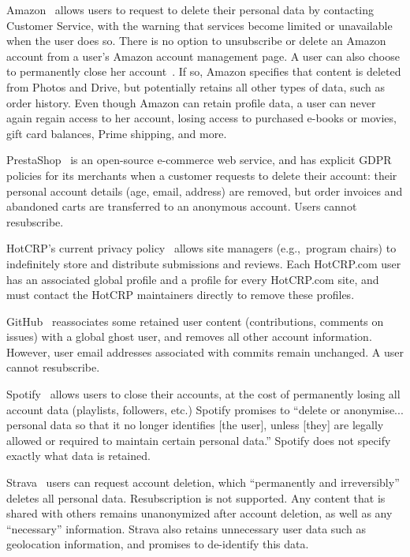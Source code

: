 Amazon~\cite{amazon:privacy} allows users to request to delete their personal data by contacting
Customer Service, with the warning that services become limited or unavailable when the user does
so. There is no option to unsubscribe or delete an Amazon account from a user's Amazon account
management page.  A user can also choose to permanently close her account~\cite{amazon:close}. If
so, Amazon specifies that content is deleted from Photos and Drive, but potentially retains all other types
of data, such as order history. Even though Amazon can retain profile data, a user can never
again regain access to her account, losing access to purchased e-books or movies, gift card
balances, Prime shipping, and more.

PrestaShop~\cite{prestashop:privacy} is an open-source e-commerce web service, and has explicit GDPR
policies for its merchants when a customer requests to delete their account: their personal account
details (age, email, address) are removed, but order invoices and abandoned carts are transferred to
an anonymous account. Users cannot resubscribe.

HotCRP's current privacy policy~\cite{hotcrp:privacy} allows site managers (e.g.,\ program chairs)
to indefinitely store and distribute submissions and reviews. Each HotCRP.com user has an associated
global profile and a profile for every HotCRP.com site, and must contact the HotCRP maintainers
directly to remove these profiles.

GitHub~\cite{github:privacy} reassociates some retained user content (contributions, comments on
issues) with a global ghost user, and removes all other account information. However, user email
addresses associated with commits remain unchanged. A user cannot resubscribe.

Spotify~\cite{spotify:privacy} allows users to close their accounts, at the cost of permanently
losing all account data (playlists, followers, etc.) Spotify promises to ``delete or anonymise...
personal data so that it no longer identifies [the user], unless [they] are legally allowed or
required to maintain certain personal data.'' Spotify does not specify exactly what data is
retained.

Strava~\cite{strava:privacy} users can request account deletion, which ``permanently and
irreversibly'' deletes all personal data. Resubscription is not supported. Any content that is
shared with others remains unanonymized after account deletion, as well as any ``necessary''
information. Strava also retains unnecessary user data such as geolocation information, and promises
to de-identify this data.

